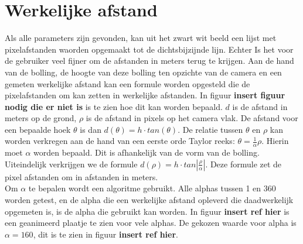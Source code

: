 \documentclass[a4paper]{article}
\begin{document}
\section{Werkelijke afstand}
Als alle parameters zijn gevonden, kan uit het zwart wit beeld een lijst met pixelafstanden waorden opgemaakt tot de dichtsbijzijnde lijn. Echter Is het voor de gebruiker veel fijner om de afstanden in meters terug te krijgen. Aan de hand van de bolling, de hoogte van deze bolling ten opzichte van de camera en een gemeten werkelijke afstand kan een formule worden opgesteld die de pixelafstanden om kan zetten in werkelijke afstanden. In figuur \textbf{insert figuur nodig die er niet is} is te zien hoe dit kan worden bepaald. $d$ is de afstand in meters op de grond, $\rho$ is de afstand in pixels op het camera vlak. De afstand voor een bepaalde hoek $\theta$ is dan $d(\theta)=h \cdot tan(\theta)$. De relatie tussen $\theta$ en $\rho$ kan worden  verkregen aan de hand van een eerste orde Taylor reeks: $\theta = \frac{1}{\alpha}\rho$. Hierin moet $\alpha$ worden bepaald. Dit is afhankelijk van de vorm van de bolling. Uiteindelijk verkrijgen we de formule $d(\rho)=h\cdot tan|\frac{\rho}{\alpha}|$. Deze formule zet de pixel afstanden om in afstanden in meters.\\
Om $\alpha$ te bepalen wordt een algoritme gebruikt. Alle alphas tussen 1 en 360 worden getest, en de alpha die een werkelijke afstand opleverd die daadwerkelijk opgemeten is, is de alpha die gebruikt kan worden. In figuur \textbf{insert ref hier} is een geanimeerd plaatje te zien voor vele alphas. De gekozen waarde voor alpha is $\alpha = 160$, dit is te zien in figuur \textbf{insert ref hier}.
\end{document}

